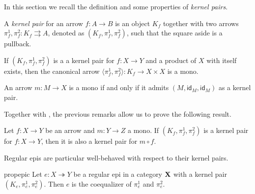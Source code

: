 \documentclass[3p]{elsarticle}
\def\X{\textbf {\textup{X}}}
\newcommand{\eto}{\twoheadrightarrow}
\newcommand{\id}[1]{\mathsf{id}_{#1}}
\theoremstyle{remark}
\theoremstyle{definition}
\begin{document}
In this section we recall the definition and some properties of \emph{kernel pairs}.

\noindent 
\begin{minipage}[l]{.85\linewidth}
\begin{defi} A \emph{kernel pair} for an arrow $f\colon A \to B$ is an object $K_f$ together with two arrows $\pi^1_f, \pi^2_f\colon K_f \rightrightarrows A$, denoted as $(K_f, \pi^1_f, \pi^2_f)$, such that the square aside is a pullback.
\end{defi}
\end{minipage} \hfill 
\begin{minipage}[r]{.18\linewidth}
\end{minipage} 

\begin{rem}\label{prop:pairng_of_kernel_pairs_mono}
If $(K_f, \pi^1_f, \pi^2_f)$ is a a kernel pair for $f\colon X \to Y$ and a product of $X$ with itself exists, then the canonical arrow $\langle \pi^1_f, \pi^2_f\rangle \colon K_f \to X \times X$ is a mono.
\end{rem}

\begin{rem}\label{prop:kermono}
An arrow $m\colon M\to X$ is a mono if and only if it admits $(M, \id{M}, \id{M})$ as a kernel pair.
\end{rem}

Together with , the previous remarks allow us to prove the following result.

\begin{prop}\label{cor:kermono}
	Let $f\colon X\to Y$ be an arrow and $m\colon Y\to Z$ a mono. If
	$(K_f, \pi_f^1, \pi_f^2)$ is a kernel pair for $f\colon X\to Y$, then it is also a kernel pair for $m\circ f$.
\end{prop}

Regular epis are particular well-behaved with respect to their kernel pairs.

\begin{restatable}{prop}{epic}\label{prop:reg_epi_coeq}
    Let $e\colon X \eto Y$ be a regular epi in a category $\X$ with a kernel pair $(K_e, \pi^1_e, \pi^2_e)$. Then $e$ is the coequalizer of $\pi^1_e$ and $\pi^2_e$.
\end{restatable}
\end{document}
